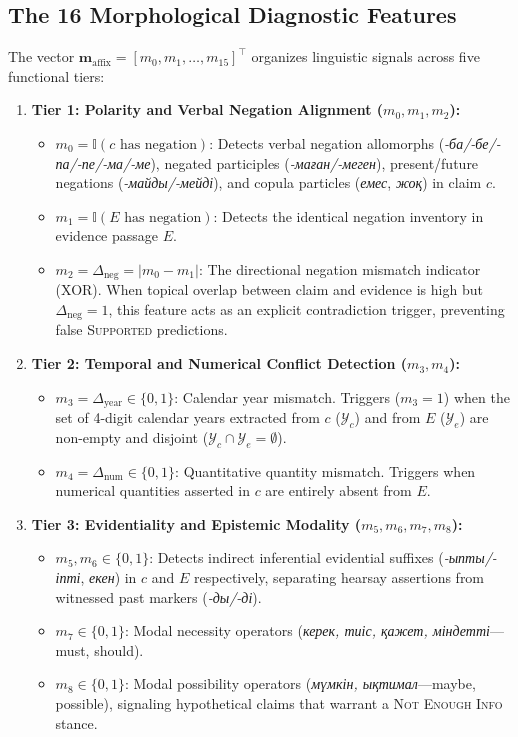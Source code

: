 \subsection{The 16 Morphological Diagnostic Features}
The vector $\mathbf{m}_{\text{affix}} = [m_0, m_1, \dots, m_{15}]^\top$ organizes linguistic signals across five functional tiers:
\begin{enumerate}
    \item \textbf{Tier 1: Polarity and Verbal Negation Alignment ($m_0, m_1, m_2$):}
    \begin{itemize}
        \item $m_0 = \mathbb{I}(c \text{ has negation})$: Detects verbal negation allomorphs (\textit{-ба/-бе/-па/-пе/-ма/-ме}), negated participles (\textit{-маған/-меген}), present/future negations (\textit{-майды/-мейді}), and copula particles (\textit{емес}, \textit{жоқ}) in claim $c$.
        \item $m_1 = \mathbb{I}(E \text{ has negation})$: Detects the identical negation inventory in evidence passage $E$.
        \item $m_2 = \Delta_{\text{neg}} = |m_0 - m_1|$: The directional negation mismatch indicator (XOR). When topical overlap between claim and evidence is high but $\Delta_{\text{neg}} = 1$, this feature acts as an explicit contradiction trigger, preventing false \textsc{Supported} predictions.
    \end{itemize}
    
    \item \textbf{Tier 2: Temporal and Numerical Conflict Detection ($m_3, m_4$):}
    \begin{itemize}
        \item $m_3 = \Delta_{\text{year}} \in \{0, 1\}$: Calendar year mismatch. Triggers ($m_3 = 1$) when the set of 4-digit calendar years extracted from $c$ ($\mathcal{Y}_c$) and from $E$ ($\mathcal{Y}_e$) are non-empty and disjoint ($\mathcal{Y}_c \cap \mathcal{Y}_e = \emptyset$).
        \item $m_4 = \Delta_{\text{num}} \in \{0, 1\}$: Quantitative quantity mismatch. Triggers when numerical quantities asserted in $c$ are entirely absent from $E$.
    \end{itemize}
    
    \item \textbf{Tier 3: Evidentiality and Epistemic Modality ($m_5, m_6, m_7, m_8$):}
    \begin{itemize}
        \item $m_5, m_6 \in \{0, 1\}$: Detects indirect inferential evidential suffixes (\textit{-ыпты/-іпті}, \textit{екен}) in $c$ and $E$ respectively, separating hearsay assertions from witnessed past markers (\textit{-ды/-ді}).
        \item $m_7 \in \{0, 1\}$: Modal necessity operators (\textit{керек, тиіс, қажет, міндетті}---must, should).
        \item $m_8 \in \{0, 1\}$: Modal possibility operators (\textit{мүмкін, ықтимал}---maybe, possible), signaling hypothetical claims that warrant a \textsc{Not Enough Info} stance.
    \end{itemize}
    

\end{enumerate}

